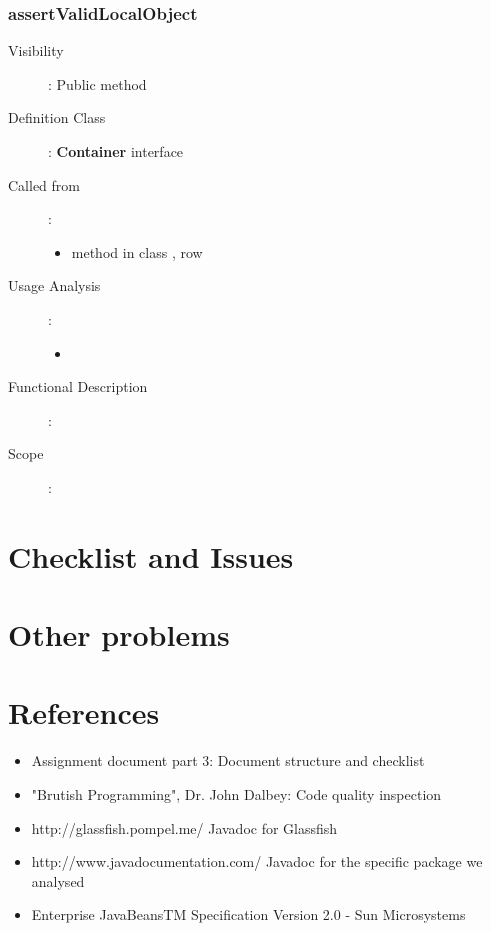 \documentclass[11pt, a4paper,titlepage]{article}
\begin{document}
	 \subsubsection{assertValidLocalObject}
	 \begin{description}
	 	\item[Visibility]: Public method
	 	\item[Definition Class]: \textbf{Container} interface
	 	\item[Called from]: 
	 	\begin{itemize}
	 		\item method \textbf{} in class \textbf{}, row \textbf{}
	 	\end{itemize}
	 	\item[Usage Analysis]: 
	 	\begin{itemize}
	 		\item 
	 	\end{itemize} 
	 	\item[Functional Description]:
	 	\item[Scope]: 
	 \end{description}
\section{Checklist and Issues}
\section{Other problems}
\section{References}
	\begin{itemize}
		\item Assignment document part 3: Document structure and checklist
		\item "Brutish Programming", Dr. John Dalbey: Code quality inspection
		\item http://glassfish.pompel.me/ Javadoc for Glassfish
		\item http://www.javadocumentation.com/ Javadoc for the specific package we analysed
		\item Enterprise JavaBeansTM Specification Version 2.0 - Sun Microsystems 
	\end{itemize}
\end{document}
